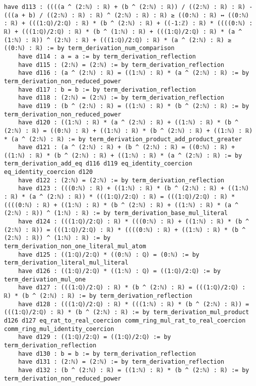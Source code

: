\documentclass{article}
\begin{document}
\begin{tcolorbox}[colback=white!10, width=\linewidth]
\begin{lstlisting}[language=Lean4]
    have d113 : ((((a ^ (2:ℕ) : ℝ) + (b ^ (2:ℕ) : ℝ)) / ((2:ℕ) : ℝ) : ℝ) - (((a + b) / ((2:ℕ) : ℝ) : ℝ) ^ (2:ℕ) : ℝ) : ℝ) ≥ ((0:ℕ) : ℝ) ↔ ((0:ℕ) : ℝ) + (((1:ℚ)/2:ℚ) : ℝ) * (b ^ (2:ℕ) : ℝ) + ((-1:ℤ) : ℝ) * ((((0:ℕ) : ℝ) + (((1:ℚ)/2:ℚ) : ℝ) * (b ^ (1:ℕ) : ℝ) + (((1:ℚ)/2:ℚ) : ℝ) * (a ^ (1:ℕ) : ℝ)) ^ (2:ℕ) : ℝ) + (((1:ℚ)/2:ℚ) : ℝ) * (a ^ (2:ℕ) : ℝ) ≥ ((0:ℕ) : ℝ) := by term_derivation_num_comparison
    have d114 : a = a := by term_derivation_reflection
    have d115 : (2:ℕ) = (2:ℕ) := by term_derivation_reflection
    have d116 : (a ^ (2:ℕ) : ℝ) = ((1:ℕ) : ℝ) * (a ^ (2:ℕ) : ℝ) := by term_derivation_non_reduced_power
    have d117 : b = b := by term_derivation_reflection
    have d118 : (2:ℕ) = (2:ℕ) := by term_derivation_reflection
    have d119 : (b ^ (2:ℕ) : ℝ) = ((1:ℕ) : ℝ) * (b ^ (2:ℕ) : ℝ) := by term_derivation_non_reduced_power
    have d120 : ((1:ℕ) : ℝ) * (a ^ (2:ℕ) : ℝ) + ((1:ℕ) : ℝ) * (b ^ (2:ℕ) : ℝ) = ((0:ℕ) : ℝ) + ((1:ℕ) : ℝ) * (b ^ (2:ℕ) : ℝ) + ((1:ℕ) : ℝ) * (a ^ (2:ℕ) : ℝ) := by term_derivation_product_add_product_greater
    have d121 : (a ^ (2:ℕ) : ℝ) + (b ^ (2:ℕ) : ℝ) = ((0:ℕ) : ℝ) + ((1:ℕ) : ℝ) * (b ^ (2:ℕ) : ℝ) + ((1:ℕ) : ℝ) * (a ^ (2:ℕ) : ℝ) := by term_derivation_add_eq d116 d119 eq_identity_coercion eq_identity_coercion d120
    have d122 : (2:ℕ) = (2:ℕ) := by term_derivation_reflection
    have d123 : (((0:ℕ) : ℝ) + ((1:ℕ) : ℝ) * (b ^ (2:ℕ) : ℝ) + ((1:ℕ) : ℝ) * (a ^ (2:ℕ) : ℝ)) * (((1:ℚ)/2:ℚ) : ℝ) = (((1:ℚ)/2:ℚ) : ℝ) * ((((0:ℕ) : ℝ) + ((1:ℕ) : ℝ) * (b ^ (2:ℕ) : ℝ) + ((1:ℕ) : ℝ) * (a ^ (2:ℕ) : ℝ)) ^ (1:ℕ) : ℝ) := by term_derivation_base_mul_literal
    have d124 : (((1:ℚ)/2:ℚ) : ℝ) * (((0:ℕ) : ℝ) + ((1:ℕ) : ℝ) * (b ^ (2:ℕ) : ℝ)) = (((1:ℚ)/2:ℚ) : ℝ) * ((((0:ℕ) : ℝ) + ((1:ℕ) : ℝ) * (b ^ (2:ℕ) : ℝ)) ^ (1:ℕ) : ℝ) := by term_derivation_non_one_literal_mul_atom
    have d125 : ((1:ℚ)/2:ℚ) * ((0:ℕ) : ℚ) = (0:ℕ) := by term_derivation_literal_mul_literal
    have d126 : ((1:ℚ)/2:ℚ) * ((1:ℕ) : ℚ) = ((1:ℚ)/2:ℚ) := by term_derivation_mul_one
    have d127 : (((1:ℚ)/2:ℚ) : ℝ) * (b ^ (2:ℕ) : ℝ) = (((1:ℚ)/2:ℚ) : ℝ) * (b ^ (2:ℕ) : ℝ) := by term_derivation_reflection
    have d128 : (((1:ℚ)/2:ℚ) : ℝ) * (((1:ℕ) : ℝ) * (b ^ (2:ℕ) : ℝ)) = (((1:ℚ)/2:ℚ) : ℝ) * (b ^ (2:ℕ) : ℝ) := by term_derivation_mul_product d126 d127 eq_rat_to_real_coercion comm_ring_mul_rat_to_real_coercion comm_ring_mul_identity_coercion
    have d129 : ((1:ℚ)/2:ℚ) = ((1:ℚ)/2:ℚ) := by term_derivation_reflection
    have d130 : b = b := by term_derivation_reflection
    have d131 : (2:ℕ) = (2:ℕ) := by term_derivation_reflection
    have d132 : (b ^ (2:ℕ) : ℝ) = ((1:ℕ) : ℝ) * (b ^ (2:ℕ) : ℝ) := by term_derivation_non_reduced_power

\end{lstlisting}
\end{tcolorbox}
\end{document}
